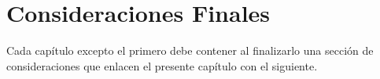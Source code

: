 






\section{Consideraciones Finales}

Cada capítulo excepto el primero debe contener al finalizarlo una sección de consideraciones que enlacen
el presente capítulo con el siguiente.

